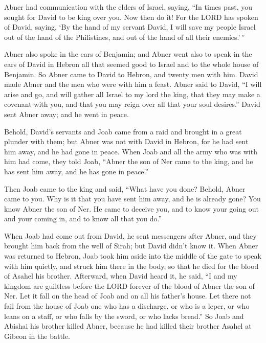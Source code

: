  Abner had communication with the elders of Israel, saying,
``In times past, you sought for David to be king over you. 
Now then do it! For the LORD has spoken of David, saying, `By the hand
of my servant David, I will save my people Israel out of the hand of the
Philistines, and out of the hand of all their enemies.'\,''

 Abner also spoke in the ears of Benjamin; and Abner went
also to speak in the ears of David in Hebron all that seemed good to
Israel and to the whole house of Benjamin.  So Abner came
to David to Hebron, and twenty men with him. David made Abner and the
men who were with him a feast.  Abner said to David, ``I
will arise and go, and will gather all Israel to my lord the king, that
they may make a covenant with you, and that you may reign over all that
your soul desires.'' David sent Abner away; and he went in peace.

 Behold, David's servants and Joab came from a raid and
brought in a great plunder with them; but Abner was not with David in
Hebron, for he had sent him away, and he had gone in peace.
 When Joab and all the army who was with him had come, they
told Joab, ``Abner the son of Ner came to the king, and he has sent him
away, and he has gone in peace.''

 Then Joab came to the king and said, ``What have you done?
Behold, Abner came to you. Why is it that you have sent him away, and he
is already gone?  You know Abner the son of Ner. He came to
deceive you, and to know your going out and your coming in, and to know
all that you do.''

 When Joab had come out from David, he sent messengers
after Abner, and they brought him back from the well of Sirah; but David
didn't know it.  When Abner was returned to Hebron, Joab
took him aside into the middle of the gate to speak with him quietly,
and struck him there in the body, so that he died for the blood of
Asahel his brother.  Afterward, when David heard it, he
said, ``I and my kingdom are guiltless before the LORD forever of the
blood of Abner the son of Ner.  Let it fall on the head of
Joab and on all his father's house. Let there not fail from the house of
Joab one who has a discharge, or who is a leper, or who leans on a
staff, or who falls by the sword, or who lacks bread.''  So
Joab and Abishai his brother killed Abner, because he had killed their
brother Asahel at Gibeon in the battle.

